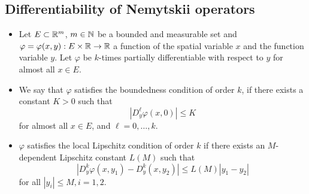 \documentclass[../skript.tex]{subfiles}
\begin{document}
\subsection{Differentiability of Nemytskii operators}
\begin{itemize}
\item Let $E \subset \mathbb{R}^m$, $m \in \mathbb{N}$ be a bounded and measurable set and $\varphi = \varphi(x, y) : E \times \mathbb{R} \to \mathbb{R}$ a function of the spatial variable $x$ and the function variable $y$. Let $\varphi$ be $k$-times partially differentiable with respect to $y$ for almost all $x \in E$.
\item We say that $\varphi$ satisfies the boundedness condition of order $k$, if there exists a constant $K > 0$ such that
\[
	|D_y^\ell \varphi(x, 0)| \leq K
\]
for almost all $x \in E$, and $\ell = 0, \ldots, k$.
\item $\varphi$ satisfies the local Lipschitz condition of order $k$ if there exists an $M$-dependent Lipschitz constant $L(M)$ such that
\[
	|D_y^k \varphi(x, y_1) - D_y^k(x, y_2)| \leq L(M) | y_1 - y_2 |
\]
for all $|y_i| \leq M, i = 1, 2$.
\end{itemize}
\end{document}
